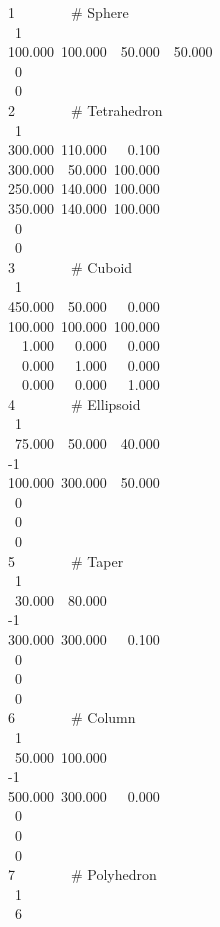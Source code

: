 ~1~~~~~~~~\# Sphere\\
~~1\\
~100.000~100.000~~50.000~~50.000\\
~~0\\
~~0\\
~2~~~~~~~~\# Tetrahedron\\
~~1\\
~300.000~110.000~~~0.100\\
~300.000~~50.000~100.000\\
~250.000~140.000~100.000\\
~350.000~140.000~100.000\\
~~0\\
~~0\\
~3~~~~~~~~\# Cuboid\\
~~1\\
~450.000~~50.000~~~0.000\\
~100.000~100.000~100.000\\
~~~1.000~~~0.000~~~0.000\\
~~~0.000~~~1.000~~~0.000\\
~~~0.000~~~0.000~~~1.000\\
~4~~~~~~~~\# Ellipsoid\\
~~1\\
~~75.000~~50.000~~40.000\\
~-1\\
~100.000~300.000~~50.000\\
~~0\\
~~0\\
~~0\\
~5~~~~~~~~\# Taper\\
~~1\\
~~30.000~~80.000\\
~-1\\
~300.000~300.000~~~0.100\\
~~0\\
~~0\\
~~0\\
~6~~~~~~~~\# Column\\
~~1\\
~~50.000~100.000\\
~-1\\
~500.000~300.000~~~0.000\\
~~0\\
~~0\\
~~0\\
~7~~~~~~~~\# Polyhedron\\
~~1\\
~~6\\
